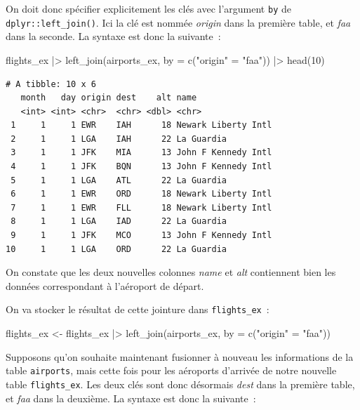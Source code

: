 \documentclass[
  letterpaper,
  DIV=11,
  numbers=noendperiod,
  oneside]{scrreprt}
\newenvironment{Shaded}{\begin{snugshade}}{\end{snugshade}}
\newcommand{\AttributeTok}[1]{\textcolor[rgb]{0.40,0.45,0.13}{#1}}
\newcommand{\DecValTok}[1]{\textcolor[rgb]{0.68,0.00,0.00}{#1}}
\newcommand{\FunctionTok}[1]{\textcolor[rgb]{0.28,0.35,0.67}{#1}}
\newcommand{\NormalTok}[1]{\textcolor[rgb]{0.00,0.23,0.31}{#1}}
\newcommand{\OtherTok}[1]{\textcolor[rgb]{0.00,0.23,0.31}{#1}}
\newcommand{\SpecialCharTok}[1]{\textcolor[rgb]{0.37,0.37,0.37}{#1}}
\newcommand{\StringTok}[1]{\textcolor[rgb]{0.13,0.47,0.30}{#1}}
\begin{document}
On doit donc spécifier explicitement les clés avec l'argument
\texttt{by} de \texttt{dplyr::left\_join()}. Ici la clé est nommée
\emph{origin} dans la première table, et \emph{faa} dans la seconde. La
syntaxe est donc la suivante~:

\begin{Shaded}
\begin{Highlighting}[]
\NormalTok{flights\_ex }\SpecialCharTok{|\textgreater{}} 
  \FunctionTok{left\_join}\NormalTok{(airports\_ex, }\AttributeTok{by =} \FunctionTok{c}\NormalTok{(}\StringTok{"origin"} \OtherTok{=} \StringTok{"faa"}\NormalTok{)) }\SpecialCharTok{|\textgreater{}} 
  \FunctionTok{head}\NormalTok{(}\DecValTok{10}\NormalTok{)}
\end{Highlighting}
\end{Shaded}

\begin{verbatim}
# A tibble: 10 x 6
   month   day origin dest    alt name               
   <int> <int> <chr>  <chr> <dbl> <chr>              
 1     1     1 EWR    IAH      18 Newark Liberty Intl
 2     1     1 LGA    IAH      22 La Guardia         
 3     1     1 JFK    MIA      13 John F Kennedy Intl
 4     1     1 JFK    BQN      13 John F Kennedy Intl
 5     1     1 LGA    ATL      22 La Guardia         
 6     1     1 EWR    ORD      18 Newark Liberty Intl
 7     1     1 EWR    FLL      18 Newark Liberty Intl
 8     1     1 LGA    IAD      22 La Guardia         
 9     1     1 JFK    MCO      13 John F Kennedy Intl
10     1     1 LGA    ORD      22 La Guardia         
\end{verbatim}

On constate que les deux nouvelles colonnes \emph{name} et \emph{alt}
contiennent bien les données correspondant à l'aéroport de départ.

On va stocker le résultat de cette jointure dans \texttt{flights\_ex}~:

\begin{Shaded}
\begin{Highlighting}[]
\NormalTok{flights\_ex }\OtherTok{\textless{}{-}}\NormalTok{ flights\_ex }\SpecialCharTok{|\textgreater{}} 
  \FunctionTok{left\_join}\NormalTok{(airports\_ex, }\AttributeTok{by =} \FunctionTok{c}\NormalTok{(}\StringTok{"origin"} \OtherTok{=} \StringTok{"faa"}\NormalTok{))}
\end{Highlighting}
\end{Shaded}

Supposons qu'on souhaite maintenant fusionner à nouveau les informations
de la table \texttt{airports}, mais cette fois pour les aéroports
d'arrivée de notre nouvelle table \texttt{flights\_ex}. Les deux clés
sont donc désormais \emph{dest} dans la première table, et \emph{faa}
dans la deuxième. La syntaxe est donc la suivante~:
\end{document}
